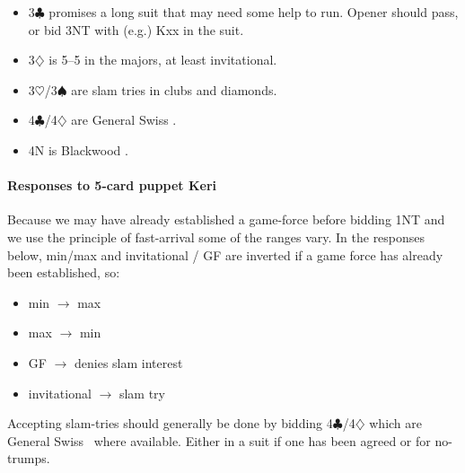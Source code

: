 \documentclass[a4paper,14pt]{extarticle}
\begin{document}
\begin{itemize}
\item 3$\clubsuit$ promises a long suit that may need some help to run.  Opener should
pass, or bid 3NT with (e.g.) Kxx in the suit.

\item 3$\diamondsuit$ is 5--5 in the majors, at least invitational.

\item 3$\heartsuit$/3$\spadesuit$ are slam tries in clubs and diamonds.

\item 4$\clubsuit$/4$\diamondsuit$ are General Swiss .

\item 4N is Blackwood .

\end{itemize}

\paragraph{Responses to 5-card puppet Keri}
\label{note:8a}

Because we may have already established a game-force before bidding 1NT and we
use the principle of fast-arrival some of the ranges vary. In the responses
below, min/max and invitational / GF are inverted if a game force has already
been established, so:

\begin{itemize}
\item min $\rightarrow$ max
\item max $\rightarrow$ min
\item GF $\rightarrow$ denies slam interest
\item invitational $\rightarrow$ slam try
\end{itemize}

Accepting slam-tries should generally be done by bidding
4$\clubsuit$/4$\diamondsuit$ which are General Swiss~ where
available. Either in a suit if one has been agreed or for no-trumps.
\end{document}
